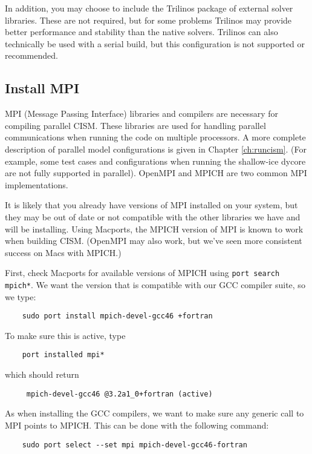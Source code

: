 In addition, you may choose to include the Trilinos package of external solver libraries.  
These are not required, but for some problems Trilinos may provide better
performance and stability than the native solvers.  Trilinos can also technically be 
used with a serial build, but this configuration is not supported or recommended.

\subsection{Install MPI}
MPI (Message Passing Interface) libraries and compilers are necessary for compiling parallel CISM.  
These libraries are used for handling parallel communications when running the 
code on multiple processors. A more complete description of parallel 
model configurations is given in Chapter \ref{ch:runcism}. 
(For example, some test cases and configurations when running the shallow-ice 
dycore are not fully supported in parallel). 
OpenMPI and MPICH are two common MPI implementations.

\begin{mdframed}[style=mac] %
It is likely that you already have versions of MPI installed on your system, 
but they may be out of date or not compatible with the other libraries we have 
and will be installing. Using Macports, the MPICH version of MPI is known 
to work when building CISM.  (OpenMPI may also work, but we've seen more 
consistent success on Macs with MPICH.)

First, check Macports for available versions of MPICH using \texttt{port search mpich*}. We want 
the version that is compatible with our GCC compiler suite, so we type: 

\begin{verbatim}
	sudo port install mpich-devel-gcc46 +fortran
\end{verbatim}

\noindent
To make sure this is active, type 
\begin{verbatim}
	port installed mpi*
\end{verbatim}

\noindent
which should return

\begin{verbatim}
     mpich-devel-gcc46 @3.2a1_0+fortran (active)
\end{verbatim}

\noindent
As when installing the GCC compilers, we want to make sure any generic call to MPI points to MPICH. This 
can be done with the following command:

\begin{verbatim}
	sudo port select --set mpi mpich-devel-gcc46-fortran
\end{verbatim}

\end{mdframed}              %



